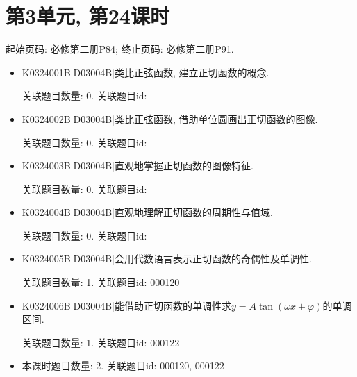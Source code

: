 \section*{第3单元, 第24课时}
起始页码: 必修第二册P84; 终止页码: 必修第二册P91.
\begin{itemize}
\item K0324001B|D03004B|类比正弦函数, 建立正切函数的概念.

关联题目数量: 0. 关联题目id: 

\item K0324002B|D03004B|类比正弦函数, 借助单位圆画出正切函数的图像.

关联题目数量: 0. 关联题目id: 

\item K0324003B|D03004B|直观地掌握正切函数的图像特征.

关联题目数量: 0. 关联题目id: 

\item K0324004B|D03004B|直观地理解正切函数的周期性与值域.

关联题目数量: 0. 关联题目id: 

\item K0324005B|D03004B|会用代数语言表示正切函数的奇偶性及单调性.

关联题目数量: 1. 关联题目id: 000120

\item K0324006B|D03004B|能借助正切函数的单调性求$y=A\tan(\omega x+\varphi)$的单调区间.

关联题目数量: 1. 关联题目id: 000122

\item 本课时题目数量: 2. 关联题目id: 000120, 000122

\end{itemize}


